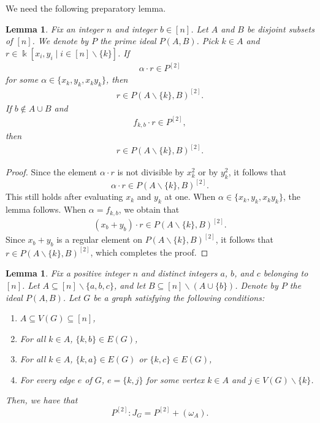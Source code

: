 \documentclass[12pt,a4paper]{amsart}
\theoremstyle{plain}
\newtheorem{lem}[thrm]{Lemma}
\def\blem{\begin{lem}}
\def\elem{\end{lem}}
\theoremstyle{definition}
\def\bproof{\begin{proof}}
\def\eproof{\end{proof}}
\theoremstyle{remark}
\let\setminus=\smallsetminus
\def\k{\Bbbk}
\renewcommand{\subset}{\subseteq}
\begin{document}
We need the following preparatory lemma.
\blem
\label{lem:descent}
Fix an integer $n$ and integer $b \in [n]$. Let $A$ and $B$ be disjoint subsets of $[n]$. We denote by $P$ the prime ideal $P(A,B)$. Pick $k \in A$ and $r \in \k[x_{i},y_{i} \mid i \in [n] \setminus \{k\}]$. If 
\begin{align*}
    \alpha \cdot r \in P^{[2]}
\end{align*}
for some $\alpha \in \{x_{k}, y_{k}, x_{k}y_{k}\}$, then 
\begin{align*}
    r \in P(A\setminus \{k\},B)^{[2]}.
\end{align*}
If $b \notin A \cup B$ and 
\begin{align*}
    f_{k,b} \cdot r \in P^{[2]},
\end{align*}
then
\begin{align*}
    r \in P(A\setminus \{k\},B)^{[2]}.
\end{align*}
\elem 

\bproof
Since the element $\alpha \cdot r$ is not divisible by $x_{k}^{2}$ or by $y_{k}^{2}$, it follows that 
\begin{equation*}
    \label{eqn:descent_0}
    \alpha \cdot r \in P(A\setminus \{k\},B)^{[2]}.
\end{equation*}
This still holds after evaluating $x_{k}$ and $y_{k}$ at one. When $\alpha \in \{x_{k},y_{k},x_{k}y_{k}\}$, the lemma follows. When $\alpha = f_{k,b}$, we obtain that 
\begin{align*}
    (x_{b} + y_{b}) \cdot r \in P(A\setminus \{k\},B)^{[2]}.
\end{align*}
Since $x_{b} + y_{b}$ is a regular element on $P(A\setminus \{k\},B)^{[2]}$, it follows that $r \in P(A\setminus \{k\},B)^{[2]}$, which completes the proof.
\eproof

\blem
\label{lem:colon_computation_T_empty}
Fix a positive integer $n$ and distinct integers $a$, $b$, and $c$ belonging to $[n]$. Let $A \subset [n] \setminus \{a,b,c\}$, and let $B \subset [n] \setminus (A \cup \{b\})$. Denote by $P$ the ideal $P(A,B)$. Let $G$ be a graph satisfying the following conditions:
\begin{enumerate}
\item $A \subset V(G) \subset [n]$,
\item For all $k \in A$, $\{k,b\} \in E(G)$,
\item For all $k \in A$, $\{k,a\} \in E(G)$ or $\{k,c\} \in E(G)$,
\item For every edge $e$ of $G$, $e = \{k,j\}$ for some vertex $k \in A$ and $j \in V(G) \setminus \{k\}$.
\end{enumerate}
Then, we have that
\begin{equation}
\label{eqn:colon_ideal_of_minl_prime_one_comp_w_graph_0}
P^{[2]}:J_{G} = P^{[2]} + (\omega_{A}).
\end{equation}
\elem 
\end{document}
